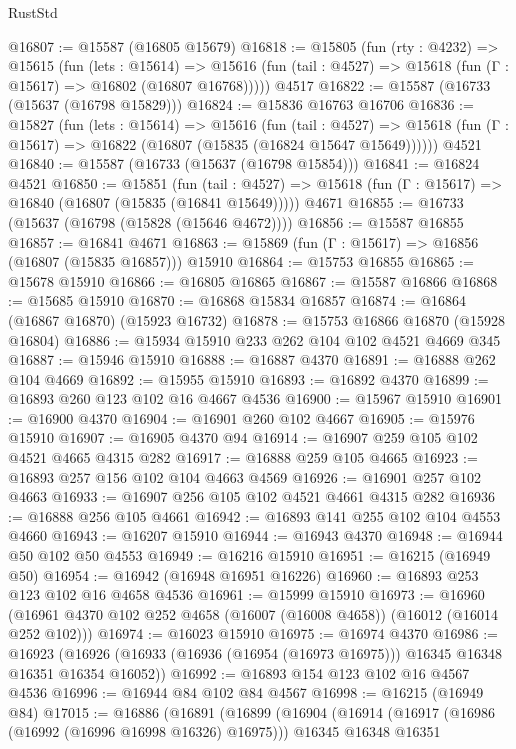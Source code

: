 \begin{lexlean}{RustStd}
\begin{coremodule}
@16807 := @15587 (@16805 @15679)
@16818 := @15805
    (fun (rty : @4232) =>
    @15615
      (fun (lets : @15614) =>
      @15616 (fun (tail : @4527) => @15618 (fun (Γ : @15617) => @16802 (@16807 @16768)))))
    @4517
@16822 := @15587 (@16733 (@15637 (@16798 @15829)))
@16824 := @15836 @16763 @16706
@16836 := @15827
    (fun (lets : @15614) =>
    @15616
      (fun (tail : @4527) =>
      @15618 (fun (Γ : @15617) => @16822 (@16807 (@15835 (@16824 @15647 @15649))))))
    @4521
@16840 := @15587 (@16733 (@15637 (@16798 @15854)))
@16841 := @16824 @4521
@16850 := @15851
    (fun (tail : @4527) => @15618 (fun (Γ : @15617) => @16840 (@16807 (@15835 (@16841 @15649)))))
    @4671
@16855 := @16733 (@15637 (@16798 (@15828 (@15646 @4672))))
@16856 := @15587 @16855
@16857 := @16841 @4671
@16863 := @15869 (fun (Γ : @15617) => @16856 (@16807 (@15835 @16857))) @15910
@16864 := @15753 @16855
@16865 := @15678 @15910
@16866 := @16805 @16865
@16867 := @15587 @16866
@16868 := @15685 @15910
@16870 := @16868 @15834 @16857
@16874 := @16864 (@16867 @16870) (@15923 @16732)
@16878 := @15753 @16866 @16870 (@15928 @16804)
@16886 := @15934 @15910 @233 @262 @104 @102 @4521 @4669 @345
@16887 := @15946 @15910
@16888 := @16887 @4370
@16891 := @16888 @262 @104 @4669
@16892 := @15955 @15910
@16893 := @16892 @4370
@16899 := @16893 @260 @123 @102 @16 @4667 @4536
@16900 := @15967 @15910
@16901 := @16900 @4370
@16904 := @16901 @260 @102 @4667
@16905 := @15976 @15910
@16907 := @16905 @4370 @94
@16914 := @16907 @259 @105 @102 @4521 @4665 @4315 @282
@16917 := @16888 @259 @105 @4665
@16923 := @16893 @257 @156 @102 @104 @4663 @4569
@16926 := @16901 @257 @102 @4663
@16933 := @16907 @256 @105 @102 @4521 @4661 @4315 @282
@16936 := @16888 @256 @105 @4661
@16942 := @16893 @141 @255 @102 @104 @4553 @4660
@16943 := @16207 @15910
@16944 := @16943 @4370
@16948 := @16944 @50 @102 @50 @4553
@16949 := @16216 @15910
@16951 := @16215 (@16949 @50)
@16954 := @16942 (@16948 @16951 @16226)
@16960 := @16893 @253 @123 @102 @16 @4658 @4536
@16961 := @15999 @15910
@16973 := @16960 (@16961 @4370 @102 @252 @4658 (@16007 (@16008 @4658)) (@16012 (@16014 @252 @102)))
@16974 := @16023 @15910
@16975 := @16974 @4370
@16986 := @16923
    (@16926 (@16933 (@16936 (@16954 (@16973 @16975))) @16345 @16348 @16351 @16354 @16052))
@16992 := @16893 @154 @123 @102 @16 @4567 @4536
@16996 := @16944 @84 @102 @84 @4567
@16998 := @16215 (@16949 @84)
@17015 := @16886
    (@16891
      (@16899
        (@16904
          (@16914
            (@16917 (@16986 (@16992 (@16996 @16998 @16326) @16975)))
            @16345
            @16348
            @16351

\end{coremodule}
\end{lexlean}
